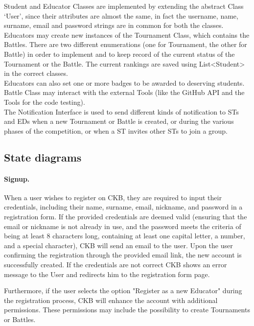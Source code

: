 Student and Educator Classes are implemented by extending the abstract Class ‘User’, since their attributes are almost the same, in fact the username, name, surname, email and password strings are in common for both the classes.\\
Educators may create new instances of the Tournament Class, which contains the Battles. There are two different enumerations (one for Tournament, the other for Battle) in order to implement and to keep record of the current status of the Tournament or the Battle. The current rankings are saved using List<Student> in the correct classes. \\
Educators can also set one or more badges to be awarded to deserving students. Battle Class may interact with the external Tools (like the GitHub API and the Tools for the code testing). \\
The Notification Interface is used to send different kinds of notification to STs and EDs when a new Tournament or Battle is created, or during the various phases of the competition, or when a ST invites other STs to join a group.\\


\subsection{State diagrams}
\label{subsec:state_diagrams}%
\paragraph{Signup.}
When a user wishes to register on CKB, they are required to input their credentials, including their name, surname, email, nickname, and password in a registration form. If the provided credentials are deemed valid (ensuring that the email or nickname is not already in use, and the password meets the criteria of being at least 8 characters long, containing at least one capital letter, a number, and a special character), CKB will send an email to the user. Upon the user confirming the registration through the provided email link, the new account is successfully created. If the credentials are not correct CKB shows an error message to the User and redirects him to the registration form page.

Furthermore, if the user selects the option "Register as a new Educator" during the registration process, CKB will enhance the account with additional permissions. These permissions may include the possibility to create Tournaments or Battles.

